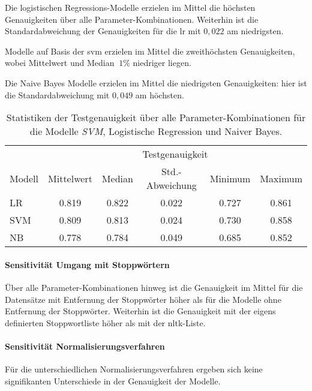 Die logistischen Regressions-Modelle erzielen im Mittel die höchsten Genauigkeiten über alle Parameter-Kombinationen.
Weiterhin ist die Standardabweichung der Genauigkeiten für die \gls{lr} mit $0,022$ am niedrigsten.

Modelle auf Basis der \gls{svm} erzielen im Mittel die zweithöchsten Genauigkeiten, wobei Mittelwert und Median $~1\%$ niedriger liegen.

Die Naive Bayes Modelle erzielen im Mittel die niedrigsten Genauigkeiten: hier ist die Standardabweichung mit $0,049$ am höchsten.
\begin{table}
    \center
    \begin{tabular}{lccccc}
        \toprule
        & \multicolumn{5}{c}{Testgenauigkeit} \\
        Modell             & Mittelwert & Median & Std.-Abweichung & Minimum & Maximum \\
        \midrule
        LR                 & 0.819      & 0.822  & 0.022           & 0.727   & 0.861 \\
        SVM                & 0.809      & 0.813  & 0.024           & 0.730   & 0.858 \\
        NB                 & 0.778      & 0.784  & 0.049           & 0.685   & 0.852 \\
        \bottomrule
    \end{tabular}
    \caption{Statistiken der Testgenauigkeit über alle Parameter-Kombinationen für die Modelle \textit{SVM}, Logistische Regression und Naiver Bayes.}
    \label{tab:stats-per-model}
\end{table}

\paragraph{Sensitivität Umgang mit Stoppwörtern}

Über alle Parameter-Kombinationen hinweg ist die Genauigkeit im Mittel für die Datensätze mit Entfernung der Stoppwörter höher als für die Modelle ohne Entfernung der Stoppwörter.
Weiterhin ist die Genauigkeit mit der eigens definierten Stoppwortliste höher als mit der \gls{nltk}-Liste.

\paragraph{Sensitivität Normalisierungsverfahren}

Für die unterschiedlichen Normalisierungsverfahren ergeben sich keine signifikanten Unterschiede in der Genauigkeit der Modelle.

